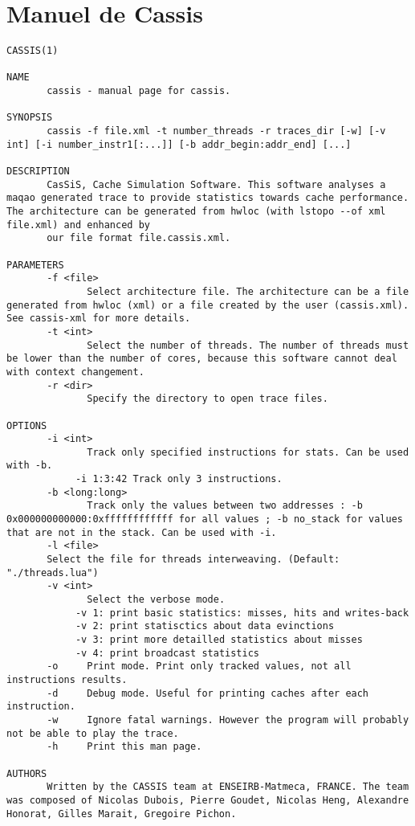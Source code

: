 \section{Manuel de Cassis}
\begin{lstlisting}[style=styleMan]
CASSIS(1)

NAME
       cassis - manual page for cassis.

SYNOPSIS
       cassis -f file.xml -t number_threads -r traces_dir [-w] [-v int] [-i number_instr1[:...]] [-b addr_begin:addr_end] [...]

DESCRIPTION
       CasSiS, Cache Simulation Software. This software analyses a maqao generated trace to provide statistics towards cache performance. The architecture can be generated from hwloc (with lstopo --of xml file.xml) and enhanced by
       our file format file.cassis.xml.

PARAMETERS
       -f <file>
              Select architecture file. The architecture can be a file generated from hwloc (xml) or a file created by the user (cassis.xml). See cassis-xml for more details.
       -t <int>
              Select the number of threads. The number of threads must be lower than the number of cores, because this software cannot deal with context changement.
       -r <dir>
              Specify the directory to open trace files.

OPTIONS
       -i <int>
              Track only specified instructions for stats. Can be used with -b.
            -i 1:3:42 Track only 3 instructions.
       -b <long:long>
              Track only the values between two addresses : -b 0x000000000000:0xffffffffffff for all values ; -b no_stack for values that are not in the stack. Can be used with -i.
       -l <file>
       Select the file for threads interweaving. (Default: "./threads.lua")
       -v <int>
              Select the verbose mode.
            -v 1: print basic statistics: misses, hits and writes-back
            -v 2: print statisctics about data evinctions
            -v 3: print more detailled statistics about misses
            -v 4: print broadcast statistics
       -o     Print mode. Print only tracked values, not all instructions results.
       -d     Debug mode. Useful for printing caches after each instruction.
       -w     Ignore fatal warnings. However the program will probably not be able to play the trace.
       -h     Print this man page.

AUTHORS
       Written by the CASSIS team at ENSEIRB-Matmeca, FRANCE. The team was composed of Nicolas Dubois, Pierre Goudet, Nicolas Heng, Alexandre Honorat, Gilles Marait, Gregoire Pichon.


\end{lstlisting}

